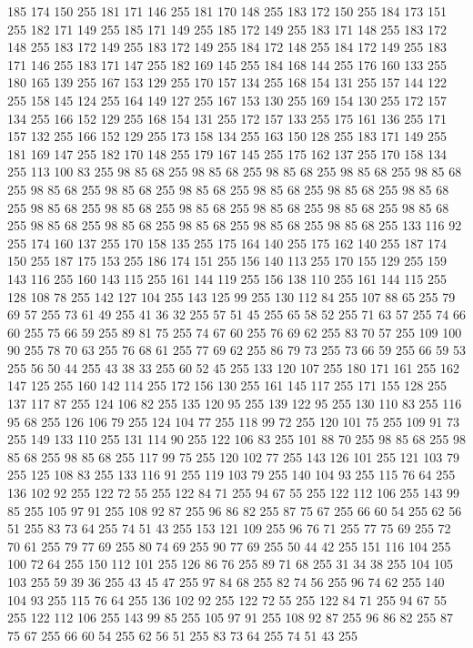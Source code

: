 185 174 150 255 181 171 146 255 181 170 148 255 183 172 150 255 184 173 151 255 182 171 149 255 185 171 149 255 185 172 149 255 183 171 148 255 183 172 148 255 183 172 149 255 183 172 149 255 184 172 148 255 184 172 149 255 183 171 146 255 183 171 147 255 182 169 145 255 184 168 144 255 176 160 133 255 180 165 139 255 167 153 129 255 170 157 134 255 168 154 131 255 157 144 122 255 158 145 124 255 164 149 127 255 167 153 130 255 169 154 130 255 172 157 134 255 166 152 129 255 168 154 131 255 172 157 133 255 175 161 136 255 171 157 132 255 166 152 129 255 173 158 134 255 163 150 128 255 183 171 149 255 181 169 147 255 182 170 148 255 179 167 145 255 175 162 137 255 170 158 134 255 113 100 83 255 98 85 68 255 98 85 68 255 98 85 68 255 98 85 68 255 98 85 68 255 98 85 68 255 98 85 68 255 98 85 68 255 98 85 68 255 98 85 68 255 98 85 68 255 98 85 68 255 98 85 68 255 98 85 68 255 98 85 68 255 98 85 68 255 98 85 68 255 98 85 68 255 98 85 68 255 98 85 68 255
98 85 68 255 98 85 68 255 133 116 92 255 174 160 137 255 170 158 135 255 175 164 140 255 175 162 140 255 187 174 150 255 187 175 153 255 186 174 151 255 156 140 113 255 170 155 129 255 159 143 116 255 160 143 115 255 161 144 119 255 156 138 110 255 161 144 115 255 128 108 78 255 142 127 104 255 143 125 99 255 130 112 84 255 107 88 65 255 79 69 57 255 73 61 49 255 41 36 32 255 57 51 45 255 65 58 52 255 71 63 57 255 74 66 60 255 75 66 59 255 89 81 75 255 74 67 60 255 76 69 62 255 83 70 57 255 109 100 90 255 78 70 63 255 76 68 61 255 77 69 62 255 86 79 73 255 73 66 59 255 66 59 53 255 56 50 44 255 43 38 33 255 60 52 45 255 133 120 107 255 180 171 161 255 162 147 125 255 160 142 114 255 172 156 130 255 161 145 117 255 171 155 128 255 137 117 87 255 124 106 82 255 135 120 95 255 139 122 95 255 130 110 83 255 116 95 68 255 126 106 79 255 124 104 77 255 118 99 72 255 120 101 75 255 109 91 73 255 149 133 110 255 131 114 90 255
122 106 83 255 101 88 70 255 98 85 68 255 98 85 68 255 98 85 68 255 117 99 75 255 120 102 77 255 143 126 101 255 121 103 79 255 125 108 83 255 133 116 91 255 119 103 79 255 140 104 93 255 115 76 64 255 136 102 92 255 122 72 55 255 122 84 71 255 94 67 55 255 122 112 106 255 143 99 85 255 105 97 91 255 108 92 87 255 96 86 82 255 87 75 67 255 66 60 54 255 62 56 51 255 83 73 64 255 74 51 43 255 153 121 109 255 96 76 71 255 77 75 69 255 72 70 61 255 79 77 69 255 80 74 69 255 90 77 69 255 50 44 42 255 151 116 104 255 100 72 64 255 150 112 101 255 126 86 76 255 89 71 68 255 31 34 38 255 104 105 103 255 59 39 36 255 43 45 47 255 97 84 68 255 82 74 56 255 96 74 62 255 140 104 93 255 115 76 64 255 136 102 92 255 122 72 55 255 122 84 71 255 94 67 55 255 122 112 106 255 143 99 85 255 105 97 91 255 108 92 87 255 96 86 82 255 87 75 67 255 66 60 54 255 62 56 51 255 83 73 64 255 74 51 43 255
